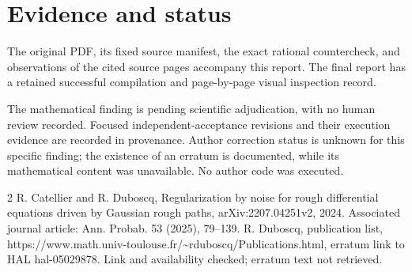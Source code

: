 \documentclass[10pt]{article}
\begin{document}
\section*{Evidence and status}
The original PDF, its fixed source manifest, the exact rational countercheck, and observations of the cited source pages accompany this report. The final report has a retained successful compilation and page-by-page visual inspection record.\par
The mathematical finding is pending scientific adjudication, with no human review recorded. Focused independent-acceptance revisions and their execution evidence are recorded in provenance. Author correction status is unknown for this specific finding; the existence of an erratum is documented, while its mathematical content was unavailable. No author code was executed.\par
2 R. Catellier and R. Duboscq, Regularization by noise for rough differential equations driven by Gaussian rough paths, arXiv:2207.04251v2, 2024. Associated journal article: Ann. Probab. 53 (2025), 79–139. R. Duboscq, publication list, https://www.math.univ-toulouse.fr/\textasciitilde{}rduboscq/Publications.html, erratum link to HAL hal-05029878. Link and availability checked; erratum text not retrieved.\par
\end{document}
